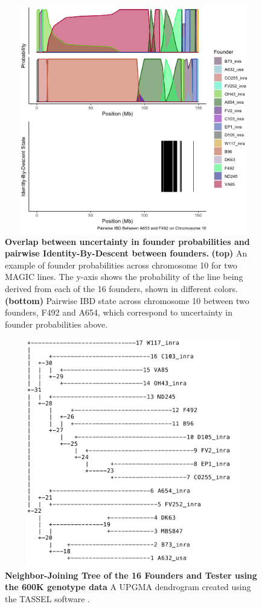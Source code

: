 \documentclass[9pt,twocolumn,twoside]{gsag3jnl}
\begin{document}
\begin{figure}[ht]
\centering
\includegraphics[width=16cm,height=10cm]{figures/IBD_supplemental.png}
\caption{\textbf{Overlap between uncertainty in founder probabilities and pairwise Identity-By-Descent between founders.} \textbf{(top)} An example of founder probabilities across chromosome 10 for two MAGIC lines. The y-axis shows the probability of the line being derived from each of the 16 founders, shown in different colors. \textbf{(bottom)} Pairwise IBD state across chromosome 10 between two founders, F492 and A654, which correspond to uncertainty in founder probabilities above.}
\label{fig:supfigure5}
\end{figure}

\begin{figure}[ht]
\centering
\includegraphics[width=16cm,height=10cm]{figures/nj_tree.png}
\caption{\textbf{Neighbor-Joining Tree of the 16 Founders and Tester using the 600K genotype data} A UPGMA dendrogram created using the TASSEL software \citep{Bradbury}.}
\label{fig:supfigure9}
\end{figure}
\end{document}

